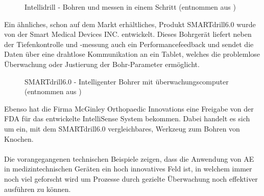 \documentclass[twoside, 12pt, a4paper]{article}
\begin{document}
	\begin{figure}[!htbp]
		\centering
		\setlength{\fboxsep}{0.5pt}
		\setlength{\fboxrule}{0.5pt}
		\caption[Intellidrill]{Intellidrill - Bohren und messen in einem Schritt (entnommen aus \cite{UniBremen.21.04.2020})}
		\label{img:Intellidrill}
	\end{figure}
	\FloatBarrier
	
	
	Ein \"ahnliches, schon auf dem Markt erh\"altliches, Produkt \glqq SMARTdrill6.0\grqq{} wurde von der Smart Medical Devices INC. entwickelt. Dieses Bohrger\"at liefert neben der Tiefenkontrolle und -messung auch ein Performancefeedback und sendet die Daten \"uber eine drahtlose Kommunikation an ein Tablet, welches die problemlose \"Uberwachung oder Justierung der Bohr-Parameter erm\"oglicht.~\cite{SMARTdrill.2020} 
	
	\begin{figure}[!htbp]
		\centering
		\setlength{\fboxsep}{0.5pt}
		\setlength{\fboxrule}{0.5pt}
		\caption[SMARTdrill6.0]{SMARTdrill6.0 - Intelligenter Bohrer mit \"uberwachungscomputer (entnommen aus \cite{SMARTdrill.2020})}
		\label{img:SMARTdrill.2020}
	\end{figure}
	\FloatBarrier       
	
	Ebenso hat die Firma McGinley Orthopaedic Innovations eine Freigabe von der FDA f\"ur das entwickelte \glqq IntelliSense\grqq{}  System bekommen. Dabei handelt es sich um ein, mit dem \glqq SMARTdrill6.0\grqq{} vergleichbares, Werkzeug zum Bohren von Knochen.\\
	\\
	Die vorangegangenen technischen Beispiele zeigen, dass die Anwendung von AE in medizintechnischen Ger\"aten ein hoch innovatives Feld ist, in welchem immer noch viel geforscht wird um Prozesse durch gezielte \"Uberwachung noch effektiver ausf\"uhren zu k\"onnen. 
\end{document}
